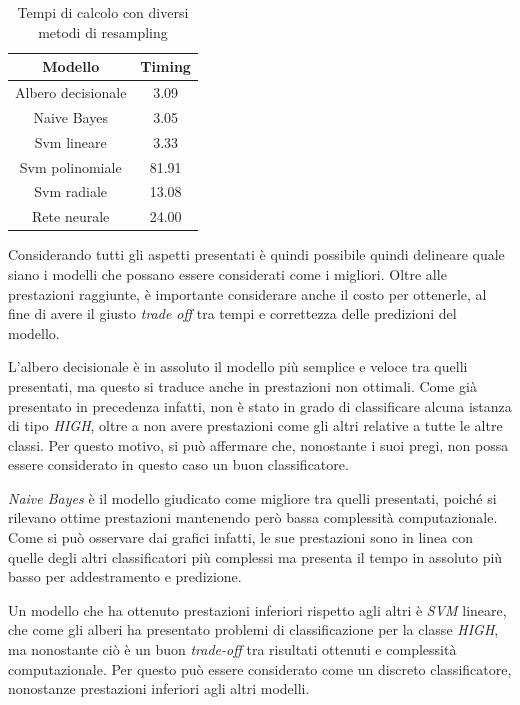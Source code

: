     \begin{table}[h]
        \centering
        \begin{tabular}{| c | c |}
            \hline
             \textbf{Modello} & \textbf{Timing} \\
             \hline
             Albero decisionale & 3.09 \\
             Naive Bayes & 3.05 \\
             Svm lineare & 3.33 \\
             Svm polinomiale & 81.91 \\
             Svm radiale & 13.08 \\
             Rete neurale & 24.00 \\
             \hline
        \end{tabular} 
        \caption{Tempi di calcolo con diversi metodi di resampling}
        \label{tab:timing}
    \end{table}
    
    Considerando tutti gli aspetti presentati è quindi possibile quindi delineare quale siano i modelli che possano essere considerati come i migliori. Oltre alle prestazioni raggiunte, è importante considerare anche il costo per ottenerle, al fine di avere il giusto \textit{trade off} tra tempi e correttezza delle predizioni del modello.
    
    L'albero decisionale è in assoluto il modello più semplice e veloce tra quelli presentati, ma questo si traduce anche in prestazioni non ottimali. Come già presentato in precedenza infatti, non è stato in grado di classificare alcuna istanza di tipo \textit{HIGH}, oltre a non avere prestazioni come gli altri relative a tutte le altre classi. Per questo motivo, si può affermare che, nonostante i suoi pregi, non possa essere considerato in questo caso un buon classificatore.
    
    \textit{Naive Bayes} è il modello giudicato come migliore tra quelli presentati, poiché si rilevano ottime prestazioni mantenendo però bassa complessità computazionale. Come si può osservare dai grafici infatti, le sue prestazioni sono in linea con quelle degli altri classificatori più complessi ma presenta il tempo in assoluto più basso per addestramento e predizione.
    
    Un modello che ha ottenuto prestazioni inferiori rispetto agli altri è \textit{SVM} lineare, che come gli alberi ha presentato problemi di classificazione per la classe \textit{HIGH}, ma nonostante ciò è un buon \textit{trade-off} tra risultati ottenuti e complessità computazionale. Per questo può essere considerato come un discreto classificatore, nonostanze prestazioni inferiori agli altri modelli.
    
